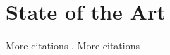 


\chapter{State of the Art}
\label{ch2:Problem}




More citations \cite{deFreitas97}. More citations \cite{Girosi95}


\newpage
